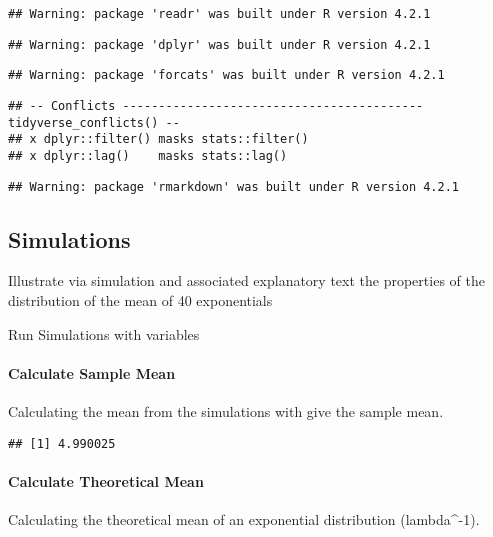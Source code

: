 \documentclass[
]{article}
\begin{document}
\begin{verbatim}
## Warning: package 'readr' was built under R version 4.2.1
\end{verbatim}

\begin{verbatim}
## Warning: package 'dplyr' was built under R version 4.2.1
\end{verbatim}

\begin{verbatim}
## Warning: package 'forcats' was built under R version 4.2.1
\end{verbatim}

\begin{verbatim}
## -- Conflicts ------------------------------------------ tidyverse_conflicts() --
## x dplyr::filter() masks stats::filter()
## x dplyr::lag()    masks stats::lag()
\end{verbatim}

\begin{verbatim}
## Warning: package 'rmarkdown' was built under R version 4.2.1
\end{verbatim}

\hypertarget{simulations}{%
\subsection{Simulations}\label{simulations}}

Illustrate via simulation and associated explanatory text the properties
of the distribution of the mean of 40 exponentials

Run Simulations with variables

\hypertarget{calculate-sample-mean}{%
\paragraph{Calculate Sample Mean}\label{calculate-sample-mean}}

Calculating the mean from the simulations with give the sample mean.

\begin{verbatim}
## [1] 4.990025
\end{verbatim}

\hypertarget{calculate-theoretical-mean}{%
\paragraph{Calculate Theoretical
Mean}\label{calculate-theoretical-mean}}

Calculating the theoretical mean of an exponential distribution
(lambda\^{}-1).
\end{document}
